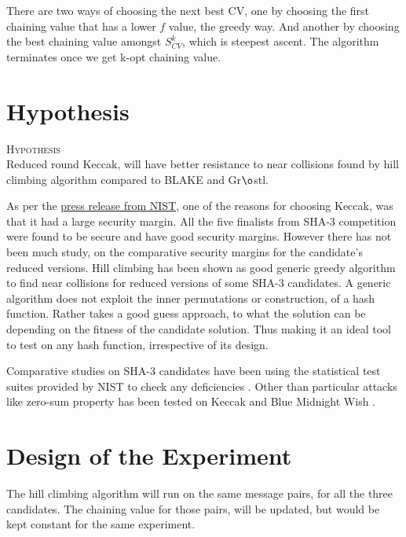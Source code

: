 There are two ways of choosing the next best CV, one by choosing the first chaining value that has a lower $f$ value, the
greedy way. And another by choosing the best chaining value amongst $S^{k}_{CV}$, which is steepest ascent. The algorithm
terminates once we get k-opt chaining value.

\section{Hypothesis}

\begin{center}
  \framebox
  {
    \parbox{375pt}
    {
      \centering \textsc{Hypothesis} \\
      Reduced round Keccak, will have better resistance to near collisions found by hill climbing algorithm
      compared to BLAKE and Gr$\o$stl.
    }
  }
\end{center}

As per the \href{"http://csrc.nist.gov/groups/ST/hash/sha-3/sha-3\_selection\_announcement.pdf"}{press release from NIST}, 
one of the reasons for choosing Keccak, was that it had a large security margin. All the five finalists from SHA-3 competition
were found to be secure and have good security margins. However there has not been much study, on the comparative security
margins for the candidate's reduced versions. Hill climbing has been shown as good generic greedy algorithm to find 
near collisions for reduced versions of some SHA-3 candidates. A generic algorithm does not exploit the inner permutations
or construction, of a hash function. Rather takes a good guess approach, to what the solution can be depending on the fitness
of the candidate solution. Thus making it an ideal tool to test on any hash function, irrespective of its design.

Comparative studies on SHA-3 candidates have been using the statistical test suites provided by NIST to check any 
deficiencies \cite{00030} \cite{00032}. Other than particular attacks like zero-sum property has been tested on 
Keccak and Blue Midnight Wish \cite{00031}.

\newpage

\section{Design of the Experiment}

The hill climbing algorithm will run on the same message pairs, for all the three candidates. The chaining value for
those pairs, will be updated, but would be kept constant for the same experiment.


